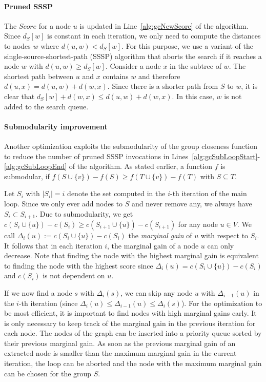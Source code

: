 \paragraph{Pruned SSSP}
The $Score$ for a node $u$ is updated in Line~\ref{alg:gcNewScore} of the algorithm. Since $d_S[w]$ is constant in each iteration, we only need to compute the distances to nodes $w$ where $d(u, w) < d_S[w]$. For this purpose, we use a variant of the single-source-shortest-path (SSSP) algorithm that aborts the search if it reaches a node $w$ with $d(u, w) \geq d_S[w]$. Consider a node $x$ in the subtree of $w$. The shortest path between $u$ and $x$ contains $w$ and therefore $d(u, x) = d(u, w) + d(w, x)$. Since there is a shorter path from $S$ to $w$, it is clear that $d_S[w] + d(w, x) \leq d(u, w) + d(w, x)$. In this case, $w$ is not added to the search queue.

\paragraph{Submodularity improvement}
Another optimization exploits the submodularity of the group closeness function to reduce the number of pruned SSSP invocations in Lines~\ref{alg:gcSubLoopStart}-\ref{alg:gcSubLoopEnd} of the algorithm. As stated earlier, a function $f$ is submodular, if $f(S \cup \{v\}) - f(S) \geq f(T \cup \{v\}) - f(T)$ with $S \subseteq T$.

Let $S_i$ with $|S_i| = i$ denote the set computed in the $i$-th iteration of the main loop. Since we only ever add nodes to $S$ and never remove any, we always have $S_i \subset S_{i + 1}$. Due to submodularity, we get $c(S_i \cup \{u\}) - c(S_i) \geq c(S_{i + 1} \cup \{u\}) - c(S_{i + 1})$ for any node $u \in V$. We call $\Delta_i(u) := c(S_i \cup \{u\}) - c(S_i)$ the \emph{marginal gain} of $u$ with respect to $S_i$. It follows that in each iteration $i$, the marginal gain of a node $u$ can only decrease. Note that finding the node with the highest marginal gain is equivalent to finding the node with the highest score since $\Delta_i(u) = c(S_i \cup \{u\}) - c(S_i)$ and $c(S_i)$ is not dependent on $u$.

If we now find a node $s$ with $\Delta_i(s)$, we can skip any node $u$ with $\Delta_{i - 1}(u)$ in the $i$-th iteration (since $\Delta_{i}(u) \leq \Delta_{i - 1}(u) \leq \Delta_i(s)$). For the optimization to be most efficient, it is important to find nodes with high marginal gains early. It is only necessary to keep track of the marginal gain in the previous iteration for each node. The nodes of the graph can be inserted into a priority queue sorted by their previous marginal gain. As soon as the previous marginal gain of an extracted node is smaller than the maximum marginal gain in the current iteration, the loop can be aborted and the node with the maximum marginal gain can be chosen for the group $S$.


